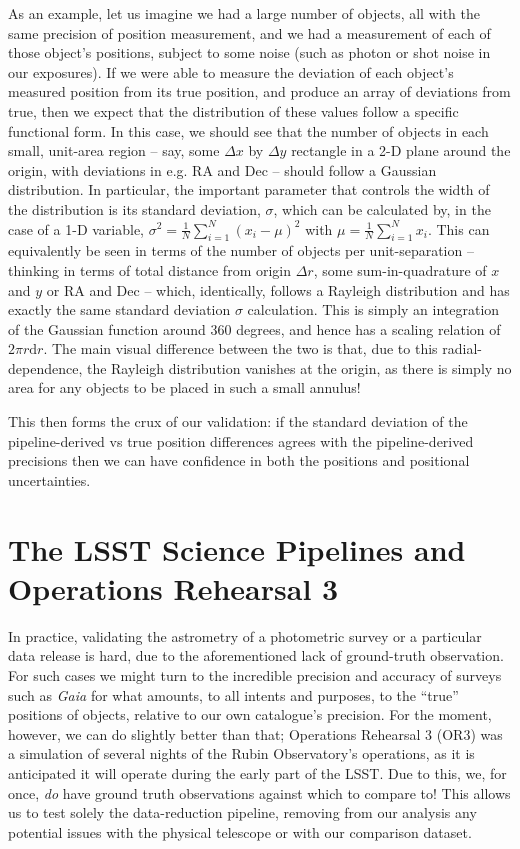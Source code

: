 \documentclass[SE,lsstdraft,authoryear,toc]{lsstdoc}
\begin{document}
As an example, let us imagine we had a large number of objects, all with the same precision of position measurement, and we had a measurement of each of those object's positions, subject to some noise (such as photon or shot noise in our exposures).
If we were able to measure the deviation of each object's measured position from its true position, and produce an array of deviations from true, then we expect that the distribution of these values follow a specific functional form.
In this case, we should see that the number of objects in each small, unit-area region -- say, some $\Delta x$ by $\Delta y$ rectangle in a 2-D plane around the origin, with deviations in e.g. RA and Dec -- should follow a Gaussian distribution.
In particular, the important parameter that controls the width of the distribution is its standard deviation, $\sigma$, which can be calculated by, in the case of a 1-D variable, $\sigma^2 = \frac{1}{N} \sum_{i=1}^N(x_i - \mu)^2$ with $\mu = \frac{1}{N}\sum_{i=1}^Nx_i$.
This can equivalently be seen in terms of the number of objects per unit-separation -- thinking in terms of total distance from origin $\Delta r$, some sum-in-quadrature of $x$ and $y$ or RA and Dec -- which, identically, follows a Rayleigh distribution and has exactly the same standard deviation $\sigma$ calculation.
This is simply an integration of the Gaussian function around 360 degrees, and hence has a scaling relation of $2\pi r \mathrm{d}r$.
The main visual difference between the two is that, due to this radial-dependence, the Rayleigh distribution vanishes at the origin, as there is simply no area for any objects to be placed in such a small annulus!

This then forms the crux of our validation: if the standard deviation of the pipeline-derived vs true position differences agrees with the pipeline-derived precisions then we can have confidence in both the positions and positional uncertainties.

\section{The LSST Science Pipelines and Operations Rehearsal 3}
\label{sec:pipeline_or3}
In practice, validating the astrometry of a photometric survey or a particular data release is hard, due to the aforementioned lack of ground-truth observation.
For such cases we might turn to the incredible precision and accuracy of surveys such as \textit{Gaia} \citep{Collaboration2021} for what amounts, to all intents and purposes, to the ``true'' positions of objects, relative to our own catalogue's precision.
For the moment, however, we can do slightly better than that; Operations Rehearsal 3 (OR3) was a simulation of several nights of the Rubin Observatory's operations, as it is anticipated it will operate during the early part of the LSST.
Due to this, we, for once, \textit{do} have ground truth observations against which to compare to!
This allows us to test solely the data-reduction pipeline, removing from our analysis any potential issues with the physical telescope or with our comparison dataset.
\end{document}

